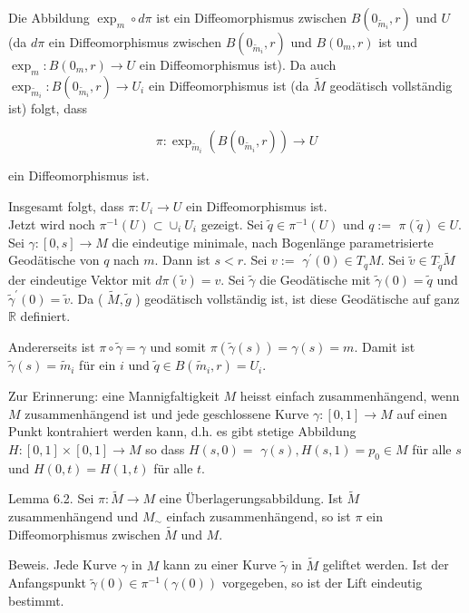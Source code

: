 \documentclass[10pt, letterpaper]{article}
\begin{document}
Die Abbildung $\exp _{m} \circ d \pi$ ist ein Diffeomorphismus zwischen $B\left(0_{\tilde{m}_{i}}, r\right)$ und $U$ (da $d \pi$ ein Diffeomorphismus zwischen $B\left(0_{\tilde{m}_{i}}, r\right)$ und $B\left(0_{m}, r\right)$ ist und $\exp _{m}: B\left(0_{m}, r\right) \rightarrow U$ ein Diffeomorphismus ist). Da auch $\exp _{\tilde{m}_{i}}: B\left(0_{\tilde{m}_{i}}, r\right) \rightarrow U_{i}$ ein Diffeomorphismus ist (da $\tilde{M}$ geodätisch vollständig ist) folgt, dass

$$
\pi: \exp _{\tilde{m}_{i}}\left(B\left(0_{\tilde{m}_{i}}, r\right)\right) \rightarrow U
$$

ein Diffeomorphismus ist.

Insgesamt folgt, dass $\pi: U_{i} \rightarrow U$ ein Diffeomorphismus ist.\\
Jetzt wird noch $\pi^{-1}(U) \subset \cup_{i} U_{i}$ gezeigt. Sei $\tilde{q} \in \pi^{-1}(U)$ und $q:=$ $\pi(\tilde{q}) \in U$. Sei $\gamma:[0, s] \rightarrow M$ die eindeutige minimale, nach Bogenlänge parametrisierte Geodätische von $q$ nach $m$. Dann ist $s<r$. Sei $v:=$ $\gamma^{\prime}(0) \in T_{q} M$. Sei $\tilde{v} \in T_{\tilde{q}} \tilde{M}$ der eindeutige Vektor mit $d \pi(\tilde{v})=v$. Sei $\tilde{\gamma}$ die Geodätische mit $\tilde{\gamma}(0)=\tilde{q}$ und $\tilde{\gamma}^{\prime}(0)=\tilde{v}$. Da ( $\tilde{M}, \tilde{g}$ ) geodätisch vollständig ist, ist diese Geodätische auf ganz $\mathbb{R}$ definiert.

Andererseits ist $\pi \circ \tilde{\gamma}=\gamma$ und somit $\pi(\tilde{\gamma}(s))=\gamma(s)=m$. Damit ist $\tilde{\gamma}(s)=\tilde{m}_{i}$ für ein $i$ und $\tilde{q} \in B\left(\tilde{m}_{i}, r\right)=U_{i}$.

Zur Erinnerung: eine Mannigfaltigkeit $M$ heisst einfach zusammenhängend, wenn $M$ zusammenhängend ist und jede geschlossene Kurve $\gamma:[0,1] \rightarrow M$ auf einen Punkt kontrahiert werden kann, d.h. es gibt stetige Abbildung $H:[0,1] \times[0,1] \rightarrow M$ so dass $H(s, 0)=$ $\gamma(s), H(s, 1)=p_{0} \in M$ für alle $s$ und $H(0, t)=H(1, t)$ für alle $t$.

Lemma 6.2. Sei $\pi: \tilde{M} \rightarrow M$ eine Überlagerungsabbildung. Ist $\tilde{M}$ zusammenhängend und $M_{\sim}$ einfach zusammenhängend, so ist $\pi$ ein Diffeomorphismus zwischen $\tilde{M}$ und $M$.

Beweis. Jede Kurve $\gamma$ in $M$ kann zu einer Kurve $\tilde{\gamma}$ in $\tilde{M}$ geliftet werden. Ist der Anfangspunkt $\tilde{\gamma}(0) \in \pi^{-1}(\gamma(0))$ vorgegeben, so ist der Lift eindeutig bestimmt.
\end{document}
